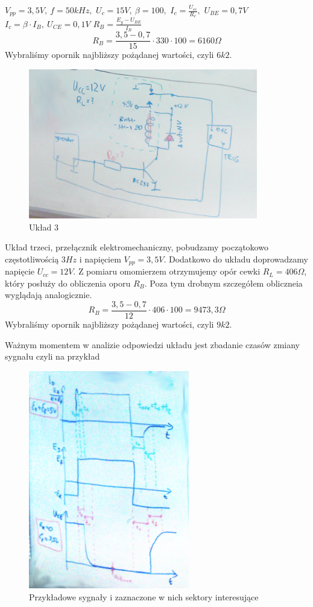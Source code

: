 \documentclass[a4paper,11pt]{article}
\begin{document}
\( V_{pp}=	3,5 V, \ f=50 kHz, \)
\( U_c= 15 V, \ \beta  =100, \) 
\( I_c= \frac {U_{cc}} {R_c}, \)
\( U_{BE} = 0,7 V \) \newline
\(  I_c=\beta \cdot I_B, \ U_{CE}=0,1 V \)
\( R_B= \frac {E_g -U_{BE}} {I_B}  \)
$$ R_B = \frac {3,5-0,7}{15} \cdot 330 \cdot 100 = 6160 \Omega $$
Wybraliśmy opornik najbliższy pożądanej wartości, czyli $6k2$.

\begin{figure} [H]
  \begin{center}
    \includegraphics[width = 10cm]{../Obrazki_i_tekst/obrobione/u3.png}
    \caption{Układ 3}
  \end{center}
\end{figure}
Układ trzeci, przełącznik elektromechaniczny, pobudzamy początokowo częstotliwością $3 Hz$ i napięciem $V_{pp}=	3,5 V$. Dodatkowo do układu doprowadzamy napięcie $U_{cc} = 12 V $. Z pomiaru omomierzem otrzymujemy opór cewki $ R_L = 406 \Omega$, który posłuży do obliczenia oporu $R_B$. Poza tym drobnym szczegółem obliczneia wyglądają analogicznie.
$$ R_B = \frac {3,5-0,7}{12} \cdot 406 \cdot 100 = 9473,3 \Omega $$
Wybraliśmy opornik najbliższy pożądanej wartości, czyli $9k2$.

Ważnym momentem w analizie odpowiedzi układu jest zbadanie czasów zmiany sygnału czyli na przykład 
\begin{figure} [H]
  \begin{center}
    \includegraphics[width = 7cm]{../Obrazki_i_tekst/obrobione/w1.png}
    \caption{Przykładowe sygnały i zaznaczone w nich sektory interesujące}
  \end{center}
\end{figure}
\end{document}

